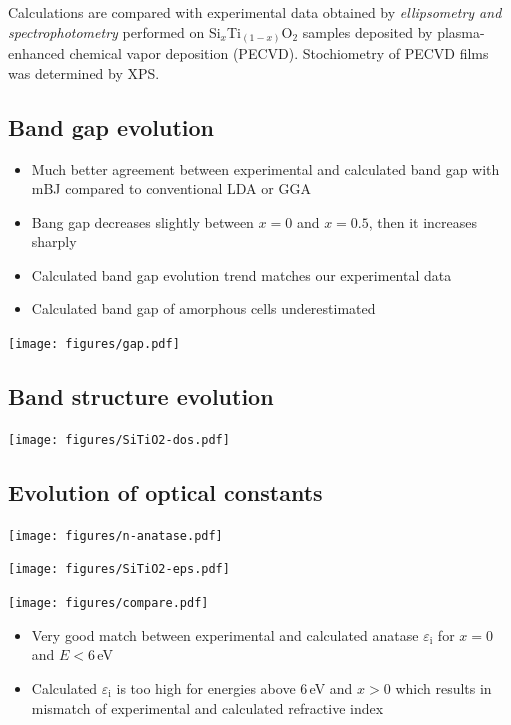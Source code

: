 \documentclass[blues]{poster}
\let\eps=\varepsilon
\begin{document}
\begin{multicols}{2}
Calculations are compared with experimental data obtained by \emph{ellipsometry and spectrophotometry} performed on Si$_x$Ti$_{(1-x)}$O$_2$ samples deposited by plasma-enhanced chemical vapor deposition (PECVD). Stochiometry of PECVD films was determined by XPS.


\subsection{Band gap evolution}

\begin{minipage}{0.4\linewidth}

\begin{itemize}
\item{Much better agreement between experimental and calculated band gap with mBJ compared to conventional LDA or GGA}
\item{Bang gap decreases slightly between $x = 0$ and $x = 0.5$, then it increases sharply}
\item{Calculated band gap evolution trend matches our experimental data}
\item{Calculated band gap of amorphous cells underestimated}
\end{itemize}

\end{minipage}
\begin{minipage}{0.6\linewidth}   

\texttt{[image: figures/gap.pdf]}
\end{minipage}


\vspace{-0.5cm}
\subsection{Band structure evolution}
\texttt{[image: figures/SiTiO2-dos.pdf]}

\subsection{Evolution of optical constants}

\texttt{[image: figures/n-anatase.pdf]}

\texttt{[image: figures/SiTiO2-eps.pdf]}


\texttt{[image: figures/compare.pdf]}

\begin{itemize}
\item{Very good match between experimental and calculated anatase $\eps_\mathrm{i}$ for $x = 0$ and $E < 6$\,eV}
\item{Calculated $\eps_\mathrm{i}$ is too high for energies above 6\,eV and $x > 0$ which results in mismatch of experimental and calculated refractive index}
\end{itemize}


\end{multicols}
\end{document}
